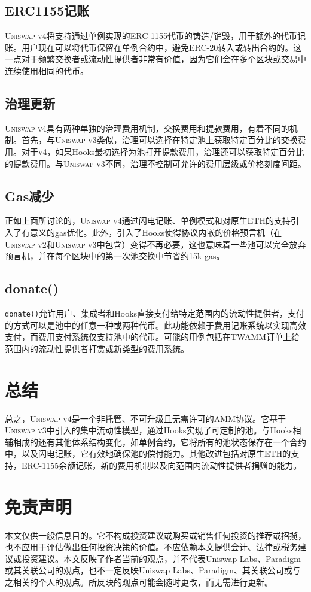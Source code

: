 \documentclass[sigconf,nonacm,prologue,table]{acmart}
\numberwithin{equation}{section}
\theoremstyle{definition}
\theoremstyle{remark}
\begin{document}
\subsection{ERC1155记账} 
\textsc{Uniswap v4}将支持通过单例实现的ERC-1155代币的铸造/销毁，用于额外的代币记账。用户现在可以将代币保留在单例合约中，避免ERC-20转入或转出合约的。这一点对于频繁交换者或流动性提供者非常有价值，因为它们会在多个区块或交易中连续使用相同的代币。

\subsection{治理更新} 
\textsc{Uniswap v4}具有两种单独的治理费用机制，交换费用和提款费用，有着不同的机制。首先，与\textsc{Uniswap v3}类似，治理可以选择在特定池上获取特定百分比的交换费用。对于\textsc{v4}，如果Hooks最初选择为池打开提款费用，治理还可以获取特定百分比的提款费用。与\textsc{Uniswap v3}不同，治理不控制可允许的费用层级或价格刻度间距。

\subsection{Gas减少}
正如上面所讨论的，\textsc{Uniswap v4}通过闪电记账、单例模式和对原生ETH的支持引入了有意义的gas优化。此外，引入了Hooks使得协议内嵌的价格预言机（在\textsc{Uniswap v2}和\textsc{Uniswap v3}中包含）变得不再必要，这也意味着一些池可以完全放弃预言机，并在每个区块中的第一次池交换中节省约15k gas。

\subsection{donate()}
\verb|donate()|允许用户、集成者和Hooks直接支付给特定范围内的流动性提供者，支付的方式可以是池中的任意一种或两种代币。此功能依赖于费用记账系统以实现高效支付，而费用支付系统仅支持池中的代币。可能的用例包括在TWAMM订单上给范围内的流动性提供者打赏或新类型的费用系统。

\section{总结}
总之，\textsc{Uniswap v4}是一个非托管、不可升级且无需许可的AMM协议。它基于\textsc{Uniswap v3}中引入的集中流动性模型，通过Hooks实现了可定制的池。与Hooks相辅相成的还有其他体系结构变化，如单例合约，它将所有的池状态保存在一个合约中，以及闪电记账，它有效地确保池的偿付能力。其他改进包括对原生ETH的支持，ERC-1155余额记账，新的费用机制以及向范围内流动性提供者捐赠的能力。




\section*{免责声明}

本文仅供一般信息目的。它不构成投资建议或购买或销售任何投资的推荐或招揽，也不应用于评估做出任何投资决策的价值。不应依赖本文提供会计、法律或税务建议或投资建议。本文反映了作者当前的观点，并不代表Uniswap Labs、Paradigm或其关联公司的观点，也不一定反映Uniswap Labs、Paradigm、其关联公司或与之相关的个人的观点。所反映的观点可能会随时更改，而无需进行更新。
\end{document}
